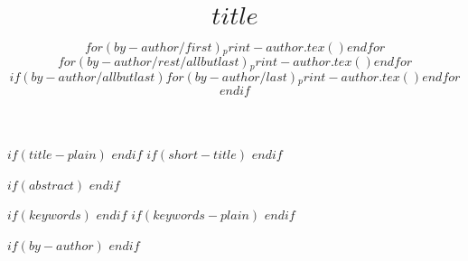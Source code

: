 
\author{$for(by-author/first)$$_print-author.tex()$$endfor$%
$for(by-author/rest/allbutlast)$\And $_print-author.tex()$$endfor$%
$if(by-author/allbutlast)$$for(by-author/last)$\AND $_print-author.tex()$$endfor$$endif$}

\title{$title$}
$if(title-plain)$
$endif$
$if(short-title)$
$endif$

$if(abstract)$
$endif$

$if(keywords)$
$endif$
$if(keywords-plain)$
$endif$


$if(by-author)$
$endif$